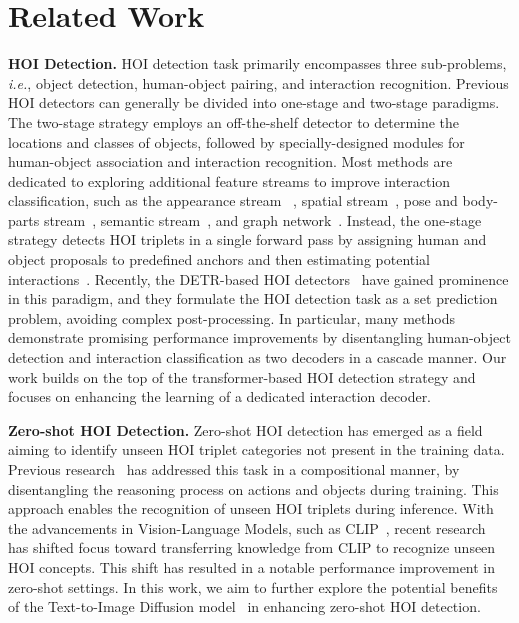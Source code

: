 \documentclass{article}
\begin{document}
 \section{Related Work}
\textbf{HOI Detection.}
HOI detection task primarily encompasses three sub-problems, \textit{i.e.}, object detection, human-object pairing, and interaction recognition.
Previous HOI detectors can generally be divided into one-stage and two-stage paradigms.
The two-stage strategy employs an off-the-shelf detector to determine the locations and classes of objects, followed by specially-designed modules for human-object association and interaction recognition.
Most methods are dedicated to exploring additional feature streams to improve interaction classification, such as the appearance stream ~\cite{gao2018ican,li2019transferable,kim2020uniondet,hou2021detecting}, spatial stream~\cite{xu2019learning,bansal2020detecting,li2020detailed}, pose and body-parts stream~\cite{gupta2019no,wan2019pose,li2020detailed}, semantic stream~\cite{liu2020consnet,bansal2020detecting,gao2020drg}, and graph network~\cite{qi2018learning,xu2019learning,wang2020contextual,zhang2021spatially,park2023viplo}.
Instead, the one-stage strategy detects HOI triplets in a single forward pass by assigning human and object proposals to predefined anchors and then estimating potential interactions~\cite{liao2020ppdm, wang2020learning,kim2020uniondet,fang2021dirv}. 
Recently, the DETR-based HOI detectors~\cite{Tamura_2021_CVPR,tamura2021qpic,kim2021hotr,chen2021qahoi,ma2023fgahoi} have gained prominence in this paradigm, and they
formulate the HOI detection task as a set prediction problem, avoiding complex post-processing. In particular, many methods~\cite{zhang2021mining,liao2022gen,zhou2022human,chen2021reformulating} demonstrate promising performance improvements by disentangling
human-object detection and interaction classification as two decoders in a cascade manner. Our work builds on the top of the transformer-based HOI detection strategy and focuses on enhancing the learning of a dedicated interaction decoder.








\textbf{Zero-shot HOI Detection.}
Zero-shot HOI detection has emerged as a field aiming to identify unseen HOI triplet categories not present in the training data.
Previous research~\cite{bansal2020detecting,peyre2019detecting,peyre2019detecting,gupta2019no,hou2020visual,hou2021affordance,hou2021detecting,liu2020consnet} has addressed this task in a compositional manner, by disentangling the reasoning process on actions and objects during training. This approach enables the recognition of unseen HOI triplets during inference.
With the advancements in Vision-Language Models, such as CLIP~\cite{radford2021learning}, recent research~\cite{liao2022gen,wu2022end,ning2023hoiclip} has shifted focus toward transferring knowledge from CLIP to recognize unseen HOI concepts. This shift has resulted in a notable performance improvement in zero-shot settings. In this work, we aim to further explore the potential benefits of the Text-to-Image Diffusion model~\cite{rombach2022high} in enhancing zero-shot HOI detection.
\end{document}
